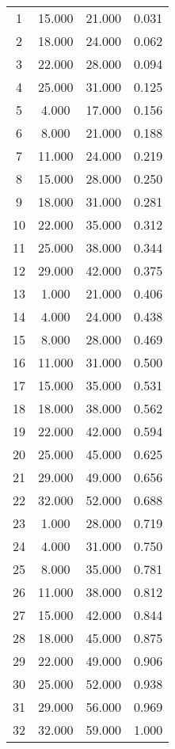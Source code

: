 % 
\begin{tabular}{cccc}
  \hline
  \hline
1 & 15.000 & 21.000 & 0.031 \\ 
  2 & 18.000 & 24.000 & 0.062 \\ 
  3 & 22.000 & 28.000 & 0.094 \\ 
  4 & 25.000 & 31.000 & 0.125 \\ 
  5 & 4.000 & 17.000 & 0.156 \\ 
  6 & 8.000 & 21.000 & 0.188 \\ 
  7 & 11.000 & 24.000 & 0.219 \\ 
  8 & 15.000 & 28.000 & 0.250 \\ 
  9 & 18.000 & 31.000 & 0.281 \\ 
  10 & 22.000 & 35.000 & 0.312 \\ 
  11 & 25.000 & 38.000 & 0.344 \\ 
  12 & 29.000 & 42.000 & 0.375 \\ 
  13 & 1.000 & 21.000 & 0.406 \\ 
  14 & 4.000 & 24.000 & 0.438 \\ 
  15 & 8.000 & 28.000 & 0.469 \\ 
  16 & 11.000 & 31.000 & 0.500 \\ 
  17 & 15.000 & 35.000 & 0.531 \\ 
  18 & 18.000 & 38.000 & 0.562 \\ 
  19 & 22.000 & 42.000 & 0.594 \\ 
  20 & 25.000 & 45.000 & 0.625 \\ 
  21 & 29.000 & 49.000 & 0.656 \\ 
  22 & 32.000 & 52.000 & 0.688 \\ 
  23 & 1.000 & 28.000 & 0.719 \\ 
  24 & 4.000 & 31.000 & 0.750 \\ 
  25 & 8.000 & 35.000 & 0.781 \\ 
  26 & 11.000 & 38.000 & 0.812 \\ 
  27 & 15.000 & 42.000 & 0.844 \\ 
  28 & 18.000 & 45.000 & 0.875 \\ 
  29 & 22.000 & 49.000 & 0.906 \\ 
  30 & 25.000 & 52.000 & 0.938 \\ 
  31 & 29.000 & 56.000 & 0.969 \\ 
  32 & 32.000 & 59.000 & 1.000 \\ 
   \hline
\end{tabular}
